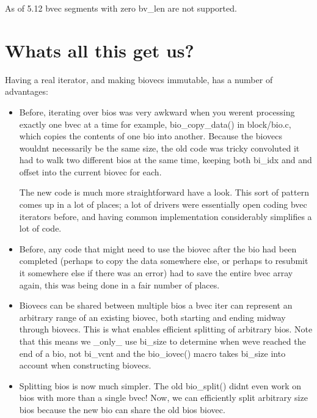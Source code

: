 \documentclass[a4paper,11pt,english]{sphinxmanual}
\begin{document}
As of 5.12 bvec segments with zero bv\_len are not supported.


\section{What\textquotesingle{}s all this get us?}
\label{\detokenize{biovecs:what-s-all-this-get-us}}
Having a real iterator, and making biovecs immutable, has a number of
advantages:
\begin{itemize}
\item {} 
Before, iterating over bios was very awkward when you weren\textquotesingle{}t processing
exactly one bvec at a time \sphinxhyphen{} for example, bio\_copy\_data() in block/bio.c,
which copies the contents of one bio into another. Because the biovecs
wouldn\textquotesingle{}t necessarily be the same size, the old code was tricky convoluted \sphinxhyphen{}
it had to walk two different bios at the same time, keeping both bi\_idx and
and offset into the current biovec for each.

The new code is much more straightforward \sphinxhyphen{} have a look. This sort of
pattern comes up in a lot of places; a lot of drivers were essentially open
coding bvec iterators before, and having common implementation considerably
simplifies a lot of code.

\item {} 
Before, any code that might need to use the biovec after the bio had been
completed (perhaps to copy the data somewhere else, or perhaps to resubmit
it somewhere else if there was an error) had to save the entire bvec array
\sphinxhyphen{} again, this was being done in a fair number of places.

\item {} 
Biovecs can be shared between multiple bios \sphinxhyphen{} a bvec iter can represent an
arbitrary range of an existing biovec, both starting and ending midway
through biovecs. This is what enables efficient splitting of arbitrary
bios. Note that this means we \_only\_ use bi\_size to determine when we\textquotesingle{}ve
reached the end of a bio, not bi\_vcnt \sphinxhyphen{} and the bio\_iovec() macro takes
bi\_size into account when constructing biovecs.

\item {} 
Splitting bios is now much simpler. The old bio\_split() didn\textquotesingle{}t even work on
bios with more than a single bvec! Now, we can efficiently split arbitrary
size bios \sphinxhyphen{} because the new bio can share the old bio\textquotesingle{}s biovec.


\end{itemize}
\end{document}
